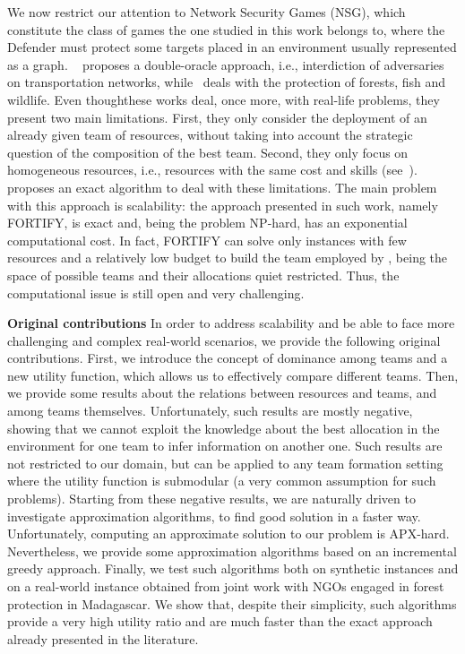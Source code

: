 We now restrict our attention to Network Security Games (NSG), which constitute the class of games the one studied in this work belongs to, where the Defender must protect some targets placed in an environment usually represented as a graph. ~\cite{jain2011double} proposes a double-oracle approach, i.e., interdiction of adversaries on transportation networks, while~\cite{johnson2012patrol,fang2015security,nguyen2015making} deals with the protection of forests, fish and wildlife. Even thoughthese works deal, once more, with real-life problems, they present two main limitations. First, they only consider the deployment of an already given team of resources, without taking into account the strategic question of the composition of the best team. Second, they only focus on homogeneous resources, i.e., resources with the same cost and skills (see~\cite{jain2013security,okamoto2012solving}). ~\cite{mc2016preventing} proposes an exact algorithm to deal with these limitations. The main problem with this approach is scalability: the approach presented in such work, namely FORTIFY, is exact and, being the problem \textsf{NP}-hard, has an exponential computational cost. In fact, FORTIFY can solve only instances with few resources and a relatively low budget to build the team employed by \Def, being the space of possible teams and their allocations quiet restricted. Thus, the computational issue is still open and very challenging.

{\bf Original contributions} In order to address scalability and be able to face more challenging and complex real-world scenarios, we provide the following original contributions. First, we introduce the concept of dominance among teams and a new utility function, which allows us to effectively compare different teams. Then, we provide some results about the relations between resources and teams, and among teams themselves. Unfortunately, such results are mostly negative, showing that we cannot exploit the knowledge about the best allocation in the environment for one team to infer information on another one. Such results are not restricted to our domain, but can be applied to any team formation setting where the utility function is submodular (a very common assumption for such problems). Starting from these negative results, we are naturally driven to investigate approximation algorithms, to find good solution in a faster way. Unfortunately, computing an approximate solution to our problem is \textsf{APX}-hard. Nevertheless, we provide some approximation algorithms based on an incremental greedy approach. Finally, we test such algorithms both on synthetic instances and on a real-world instance obtained from joint work with NGOs engaged in forest protection in Madagascar. We show that, despite their simplicity, such algorithms provide a very high utility ratio and are much faster than the exact approach already presented in the literature.